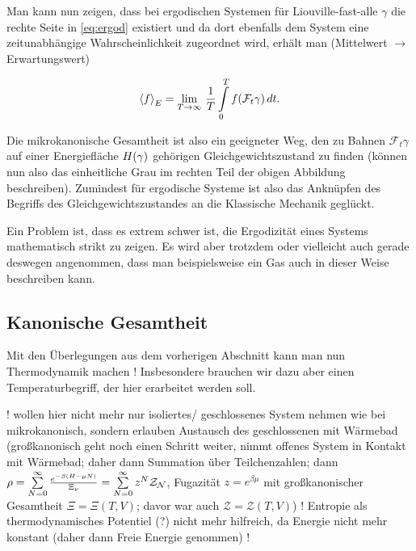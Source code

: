\documentclass[../KlassMech_main.tex]{subfiles}
\begin{document}
Man kann nun zeigen, dass bei ergodischen Systemen für Liouville-fast-alle $\gamma$ die rechte Seite in \eqref{eq:ergod} existiert und da dort ebenfalls dem System eine zeitunabhängige Wahrscheinlichkeit zugeordnet wird, erhält man (Mittelwert $\rightarrow$ Erwartungswert)

\begin{equation}
\expval{f}_E = \lim_{T \rightarrow \infty} \, \frac{1}{T} \int\limits_0^T f\qty(\mathcal{F}_t \gamma) \, dt .
\end{equation}

Die mikrokanonische Gesamtheit ist also ein geeigneter Weg, den zu Bahnen $\mathcal{F}_t \gamma$ auf einer Energiefläche $H\qty(\gamma)$ gehörigen Gleichgewichtszustand zu finden (können nun also das einheitliche Grau im rechten Teil der obigen Abbildung beschreiben). Zumindest für ergodische Systeme ist also das Anknüpfen des Begriffs des Gleichgewichtszustandes an die Klassische Mechanik geglückt.

Ein Problem ist, dass es extrem schwer ist, die Ergodizität eines Systems mathematisch strikt zu zeigen. Es wird aber trotzdem oder vielleicht auch gerade deswegen angenommen, dass man beispielsweise ein Gas auch in dieser Weise beschreiben kann.






	\subsection{Kanonische Gesamtheit}
Mit den Überlegungen aus dem vorherigen Abschnitt kann man nun Thermodynamik machen ! Insbesondere brauchen wir dazu aber einen Temperaturbegriff, der hier erarbeitet werden soll.

! wollen hier nicht mehr nur isoliertes/ geschlossenes System nehmen wie bei mikrokanonisch, sondern erlauben Austausch des geschlossenen mit Wärmebad (großkanonisch geht noch einen Schritt weiter, nimmt offenes System in Kontakt mit Wärmebad; daher dann Summation über Teilchenzahlen; dann $\rho = \sum\limits_{N = 0}^\infty \frac{e^{-\beta \qty(H - \mu N)}}{\Xi_\nu} = \sum\limits_{N = 0}^\infty z^N \mathcal{Z_N}$, Fugazität $z = e^{\beta \mu}$ mit großkanonischer Gesamtheit $\Xi = \Xi(T, V)$; davor war auch $\mathcal{Z} = \mathcal{Z}(T, V)$) ! Entropie als thermodynamisches Potentiel (?) nicht mehr hilfreich, da Energie nicht mehr konstant (daher dann Freie Energie genommen) !
\end{document}
